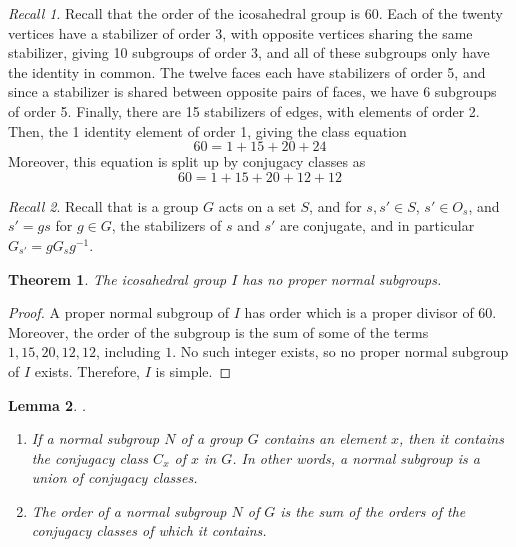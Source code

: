 \documentclass[12pt]{article}
\newtheorem{thm}{Theorem}[section]
\newtheorem{lem}[thm]{Lemma}  %
\theoremstyle{definition}
\theoremstyle{remark}
\newtheorem*{rec}{Recall}
\numberwithin{equation}{section}
\begin{document}
\begin{rec}
        Recall that the order of the icosahedral group is $60$. Each of the twenty vertices have a stabilizer of order 3, with opposite vertices sharing the same stabilizer, giving 10 subgroups of order 3, and all of these subgroups only have the identity in common. The twelve faces each have stabilizers of order 5, and since a stabilizer is shared between opposite pairs of faces, we have 6 subgroups of order 5. Finally, there are 15 stabilizers of edges, with elements of order 2. Then, the 1 identity element of order 1, giving the class equation \begin{equation}
                60 = 1 + 15 + 20 + 24
        \end{equation}
        Moreover, this equation is split up by conjugacy classes as \begin{equation}
                60 = 1 + 15 + 20 + 12 + 12 
        \end{equation}
\end{rec}


\vspace{15pt}

\begin{rec}
        Recall that is a group $G$ acts on a set $S$, and for $s,s' \in S$, $s' \in O_s$, and $s' = gs$ for $g \in G$, the stabilizers of $s$ and $s'$ are conjugate, and in particular $G_{s'} = gG_sg^{-1}$.
\end{rec}

\vspace{15pt}

\begin{thm}
        The icosahedral group $I$ has no proper normal subgroups.
\end{thm}
\begin{proof}
        A proper normal subgroup of $I$ has order which is a proper divisor of 60. Moreover, the order of the subgroup is the sum of some of the terms $1,15,20,12,12$, including $1$. No such integer exists, so no proper normal subgroup of $I$ exists. Therefore, $I$ is simple.
\end{proof}



\vspace{15pt}


\begin{lem}
        .\newline \begin{enumerate}
                \item If a normal subgroup $N$ of a group $G$ contains an element $x$, then it contains the conjugacy class $C_x$ of $x$ in $G$. In other words, a normal subgroup is a union of conjugacy classes.
                \item The order of a normal subgroup $N$ of $G$ is the sum of the orders of the conjugacy classes of which it contains.
        \end{enumerate}
\end{lem}
\end{document}
